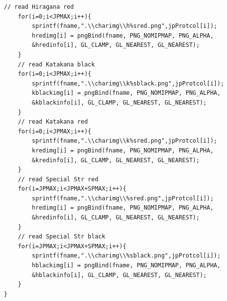 \documentclass[a4j]{jarticle}
\begin{document}
\begin{lstlisting}[basicstyle=\ttfamily\footnotesize, frame=single,label=readImg,caption=readImg関数]
    // read Hiragana red
    for(i=0;i<JPMAX;i++){
        sprintf(fname,".\\charimg\\h%sred.png",jpProtcol[i]);
        hredimg[i] = pngBind(fname, PNG_NOMIPMAP, PNG_ALPHA, 
        &hredinfo[i], GL_CLAMP, GL_NEAREST, GL_NEAREST);
    }
    // read Katakana black
    for(i=0;i<JPMAX;i++){
        sprintf(fname,".\\charimg\\k%sblack.png",jpProtcol[i]);
        kblackimg[i] = pngBind(fname, PNG_NOMIPMAP, PNG_ALPHA, 
        &kblackinfo[i], GL_CLAMP, GL_NEAREST, GL_NEAREST);
    }
    // read Katakana red
    for(i=0;i<JPMAX;i++){
        sprintf(fname,".\\charimg\\k%sred.png",jpProtcol[i]);
        kredimg[i] = pngBind(fname, PNG_NOMIPMAP, PNG_ALPHA, 
        &kredinfo[i], GL_CLAMP, GL_NEAREST, GL_NEAREST);
    }
    // read Special Str red
    for(i=JPMAX;i<JPMAX+SPMAX;i++){
        sprintf(fname,".\\charimg\\%sred.png",jpProtcol[i]);
        hredimg[i] = pngBind(fname, PNG_NOMIPMAP, PNG_ALPHA, 
        &hredinfo[i], GL_CLAMP, GL_NEAREST, GL_NEAREST);
    }
    // read Special Str black
    for(i=JPMAX;i<JPMAX+SPMAX;i++){
        sprintf(fname,".\\charimg\\%sblack.png",jpProtcol[i]);
        hblackimg[i] = pngBind(fname, PNG_NOMIPMAP, PNG_ALPHA, 
        &hblackinfo[i], GL_CLAMP, GL_NEAREST, GL_NEAREST);
    }
}
      \end{lstlisting}
\end{document}
